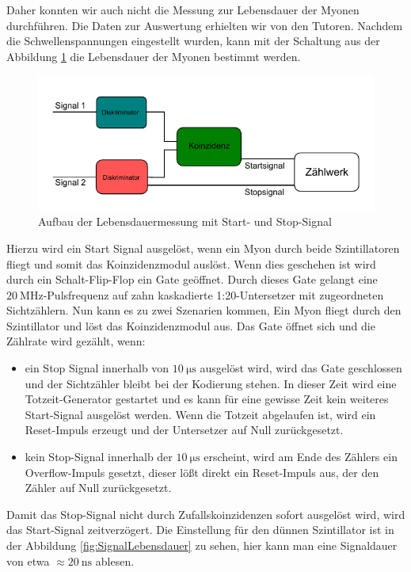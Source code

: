 \documentclass{article}
\begin{document}
Daher konnten wir auch nicht die Messung zur Lebensdauer der Myonen durchführen. Die Daten zur Auswertung erhielten wir von den Tutoren.
Nachdem die Schwellenspannungen eingestellt wurden, kann mit der Schaltung aus der Abbildung \ref{fig:AufbauZerfall} die Lebensdauer der Myonen bestimmt werden.
\begin{figure}[H]
    \centering
    \includegraphics[width=1\textwidth]{figures/Aufbau_Zerfallsmessung.pdf}
    \caption{Aufbau der Lebensdauermessung mit Start- und Stop-Signal}
    \label{fig:AufbauZerfall} 
\end{figure}
Hierzu wird ein Start Signal ausgelöst, wenn ein Myon durch beide Szintillatoren fliegt und somit das Koinzidenzmodul auslöst. 
Wenn dies geschehen ist wird durch ein Schalt-Flip-Flop ein Gate geöffnet. Durch dieses Gate gelangt eine $\SI{20}{\mega\hertz}$-Pulsfrequenz auf zahn kaskadierte 1:20-Untersetzer mit
zugeordneten Sichtzählern. Nun kann es zu zwei Szenarien kommen, Ein Myon fliegt durch den Szintillator und löst das Koinzidenzmodul aus. Das Gate öffnet sich und die Zählrate wird gezählt, wenn:
\begin{itemize}
    \item ein Stop Signal innerhalb von $\SI{10}{\micro\second}$ ausgelöst wird, wird das Gate geschlossen und der Sichtzähler bleibt bei der Kodierung stehen. In dieser Zeit wird eine Totzeit-Generator gestartet
    und es kann für eine gewisse Zeit kein weiteres Start-Signal ausgelöst werden. Wenn die Totzeit abgelaufen ist, wird ein Reset-Impuls erzeugt und der Untersetzer auf Null zurückgesetzt.
    \item kein Stop-Signal innerhalb der $\SI{10}{\micro\second}$ erscheint, wird am Ende des Zählers ein Overflow-Impuls gesetzt, dieser lößt direkt ein Reset-Impuls aus, der den Zähler auf Null zurückgesetzt. 
\end{itemize}
Damit das Stop-Signal nicht durch Zufallskoinzidenzen sofort ausgelöst wird, wird das Start-Signal zeitverzögert.
Die Einstellung für den dünnen Szintillator ist in der Abbildung \ref{fig:SignalLebensdauer} zu sehen, hier kann man eine Signaldauer von etwa $\approx \SI{20}{\nano\s}$ ablesen.
\end{document}
